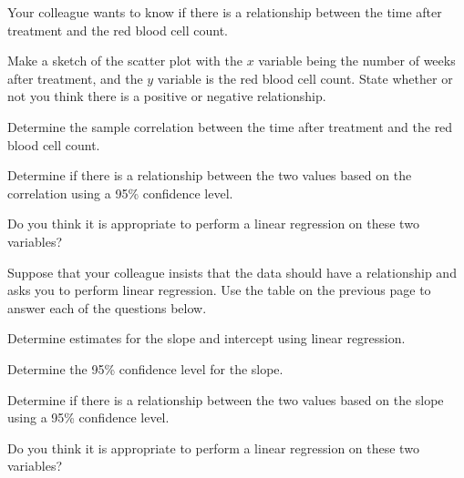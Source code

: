 \begin{problem}
Your colleague wants to know if there is a relationship between the
time after treatment and the red blood cell count.

  \begin{subproblem}
  \item Make a sketch of the scatter plot with the $x$ variable being
    the number of weeks after treatment, and the $y$ variable is the
    red blood cell count. State whether or not you think there is a
    positive or negative relationship.  
    \vfill

  \item Determine the sample correlation between the time after
    treatment and the red blood cell count. 
    \vfill

  \item Determine if there is a relationship between the two values
    based on the correlation using a 95\% confidence level.
    \vfill

  \item Do you think it is appropriate to perform a linear regression
    on these two variables?
  \end{subproblem}

  \clearpage

\item Suppose that your colleague insists that the data should have a
  relationship and asks you to perform linear regression. Use the
  table on the previous page to answer each of the questions below.

  \begin{subproblem}
  \item Determine estimates for the slope and intercept using linear
    regression. 
    \vfill
  \item Determine the 95\% confidence level for the slope.
    \vfill
  \item Determine if there is a relationship between the two values
    based on the slope using a 95\% confidence level.  
    \vfill

  \item Do you think it is appropriate to perform a linear regression
    on these two variables?
  \end{subproblem}


\end{problem}





